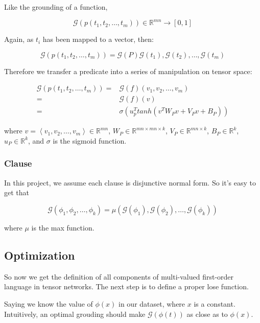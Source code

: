 Like the grounding of a function,

\begin{equation}
    \mathcal{G}(p(t_1,t_2,\dots,t_m)) \in \mathbb{R}^{mn}\rightarrow [0,1]
\end{equation}

Again, as $t_i$ has been mapped to a vector, then:

\begin{equation}
    \mathcal{G}(p(t_1,t_2,\dots,t_m))=\mathcal{G}(P)\mathcal{G}(t_1),\mathcal{G}(t_2),\dots,\mathcal{G}(t_m)
\end{equation}

Therefore we transfer a predicate into a series of manipulation on tensor space:

\begin{align}
    \mathcal{G}(p(t_1,t_2,\dots,t_m))=&\mathcal{G}(f)(v_1,v_2,\dots,v_m) \nonumber \\
    =&\mathcal{G}(f)(v) \nonumber \\
    =&\sigma(u_p^T tanh(v^{T} W_{P} v +V_Pv+B_P))
\end{align}

where $v=\left< v_1,v_2,\dots,v_m \right> \in \mathbb{R}^{mn} $, $W_P \in \mathbb{R}^{mn \times mn \times k}$, $V_P \in \mathbb{R}^{mn \times k}$, $B_P \in \mathbb{R}^{k}$, $u_P \in \mathbb{R}^{k}$, and $\sigma$ is the sigmoid function.

\subsubsection{Clause}

In this project, we assume each clause is disjunctive normal form. So it's easy to get that

\begin{equation}
    \mathcal{G}(\phi_1, \phi_2, \dots, \phi_k)=\mu(\mathcal{G}(\phi_1),\mathcal{G}(\phi_2),\dots,\mathcal{G}(\phi_k))
\end{equation}

where $\mu$ is the max function.

\subsection{Optimization}

So now we get the definition of all components of multi-valued first-order language in tensor networks. The next step is to define a proper lose function.

Saying we know the value of $\phi(x)$ in our dataset, where $x$ is a constant. Intuitively, an optimal grouding should make $\mathcal{G}(\phi(t))$ as close as to $\phi(x)$.
